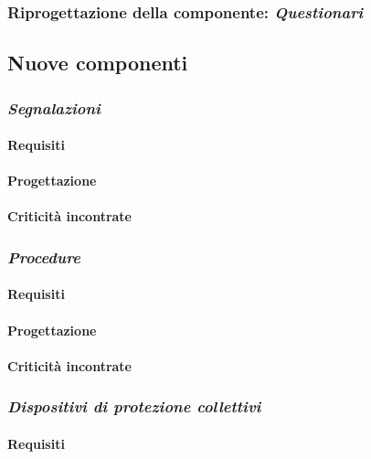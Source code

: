 \subsubsection{Riprogettazione della componente: \textit{Questionari}}

\newpage
\subsection{Nuove componenti}
\subsubsection{\textit{Segnalazioni}}
	\paragraph{Requisiti}
	\paragraph{Progettazione}
	\paragraph{Criticità incontrate}
\newpage
\subsubsection{\textit{Procedure}}
	\paragraph{Requisiti}
	\paragraph{Progettazione}
	\paragraph{Criticità incontrate}
\newpage
\subsubsection{\textit{Dispositivi di protezione collettivi}}
	\paragraph{Requisiti}

